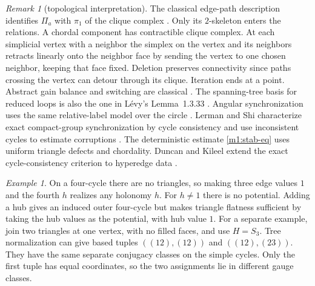 \documentclass[11pt,reqno]{amsart}
\theoremstyle{definition}
\theoremstyle{remark}
\newtheorem{remark}[theorem]{Remark}
\newtheorem{example}[theorem]{Example}
\numberwithin{equation}{section}
\begin{document}
\begin{remark}[topological interpretation]\label{m1:topology}
The classical edge-path description identifies \(\Pi_a\) with
\(\pi_1\) of the clique complex \cite[Ch.~3]{m1:Spanier}.
Only its \(2\)-skeleton enters the relations. A chordal
component has contractible clique complex. At each simplicial
vertex with a neighbor the simplex on the vertex and its
neighbors retracts linearly onto the neighbor face by sending
the vertex to one chosen neighbor, keeping that face fixed.
Deletion preserves connectivity since paths crossing the vertex
can detour through its clique. Iteration ends at a point.
Abstract gain balance and switching are classical
\cite{m1:Zaslavsky}. The spanning-tree basis for reduced loops is
also the one in L\'evy's Lemma~1.3.33 \cite{Levy10}. Angular synchronization uses the same
relative-label model over the circle \cite{m1:Singer}.
Lerman and Shi characterize exact compact-group synchronization
by cycle consistency and use inconsistent cycles to estimate
corruptions \cite[\S3, Proposition~3]{m1:LermanShi}. The deterministic estimate
\eqref{m1:stab-eq} uses uniform triangle defects and chordality. Duncan and Kileel
extend the exact cycle-consistency criterion to hyperedge data
\cite[Theorems~3.1 and 3.5]{m1:DuncanKileel}.
\end{remark}

\begin{example}\label{m1:cycles}
On a four-cycle there are no triangles, so making three edge
values \(1\) and the fourth \(h\) realizes any holonomy \(h\).
For \(h\ne1\) there is no potential. Adding a hub gives an
induced outer four-cycle but makes triangle flatness sufficient
by taking the hub values as the potential, with hub value \(1\).
For a separate example, join two triangles at one vertex, with
no filled faces, and use \(H=S_3\).
Tree normalization can give based tuples \(((12),(12))\)
and \(((12),(23))\). They have the same separate conjugacy
classes on the simple cycles. Only the first tuple has equal
coordinates, so the two assignments lie in different gauge classes.
\end{example}
\end{document}
